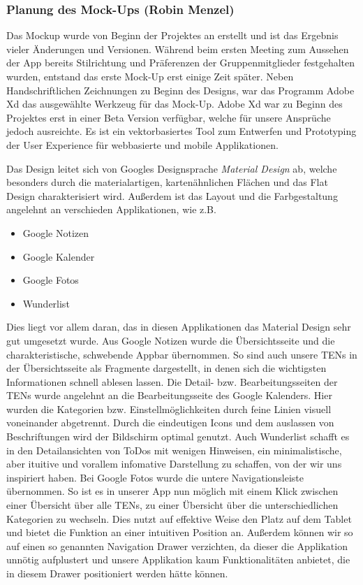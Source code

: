 \subsubsection{Planung des Mock-Ups (Robin Menzel)}
Das Mockup wurde von Beginn der Projektes an erstellt und ist das Ergebnis vieler Änderungen und Versionen. Während beim ersten Meeting zum Aussehen der App bereits Stilrichtung und Präferenzen der Gruppenmitglieder festgehalten wurden, entstand das erste Mock-Up erst einige Zeit später. Neben Handschriftlichen Zeichnungen zu Beginn des Designs, war das Programm Adobe Xd das ausgewählte Werkzeug für das Mock-Up. Adobe Xd war zu Beginn des Projektes erst in einer Beta Version verfügbar, welche für unsere Ansprüche jedoch ausreichte. Es ist ein vektorbasiertes Tool zum Entwerfen und Prototyping der User Experience für webbasierte und mobile Applikationen.

Das Design leitet sich von Googles Designsprache \textit{Material Design} ab, welche besonders durch die materialartigen, kartenähnlichen Flächen und das Flat Design charakterisiert wird. Außerdem ist das Layout und die Farbgestaltung angelehnt an verschieden Applikationen, wie z.B.
\begin{itemize}
\item Google Notizen
\item Google Kalender
\item Google Fotos
\item Wunderlist
\end{itemize}
Dies liegt vor allem daran, das in diesen Applikationen das Material Design sehr gut umgesetzt wurde. Aus Google Notizen wurde die Übersichtsseite und die charakteristische, schwebende Appbar übernommen. So sind auch unsere TENs in der Übersichtsseite als Fragmente dargestellt, in denen sich die wichtigsten Informationen schnell ablesen lassen. Die Detail- bzw. Bearbeitungsseiten der TENs wurde angelehnt an die Bearbeitungsseite des Google Kalenders. Hier wurden die Kategorien bzw. Einstellmöglichkeiten durch feine Linien visuell voneinander abgetrennt. Durch die eindeutigen Icons und dem auslassen von Beschriftungen wird der Bildschirm optimal genutzt. Auch Wunderlist schafft es in den Detailansichten von ToDos mit wenigen Hinweisen, ein minimalistische, aber ituitive und vorallem infomative Darstellung zu schaffen, von der wir uns inspiriert haben. Bei Google Fotos wurde die untere Navigationsleiste übernommen. So ist es in unserer App nun möglich mit einem Klick zwischen einer Übersicht über alle TENs, zu einer Übersicht über die unterschiedlichen Kategorien zu wechseln. Dies nutzt auf effektive Weise den Platz auf dem Tablet und bietet die Funktion an einer intuitiven Position an. Außerdem können wir so auf einen so genannten Navigation Drawer verzichten, da dieser die Applikation unnötig aufplustert und unsere Applikation kaum Funktionalitäten anbietet, die in diesem Drawer positioniert werden hätte können.

